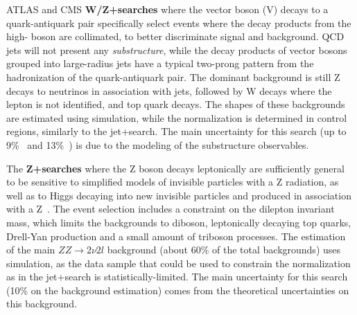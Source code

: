 ATLAS and CMS \textbf{W/Z+\MET searches} where the vector boson (V) decays to a quark-antiquark pair specifically select events where the decay products from the high-\pt{} boson are collimated, to better discriminate signal and background. 
QCD jets will not present any \textit{substructure}, while the decay products of vector bosons grouped into large-radius jets have a typical two-prong pattern from the hadronization of the quark-antiquark pair. 
The dominant background is still Z decays to neutrinos in association with jets, followed by W decays where the lepton is not identified, and top quark decays. 
The shapes of these backgrounds are estimated using simulation, while the normalization is determined in control regions, similarly to the jet+\MET search. 
The main uncertainty for this search (up to 9\%~\cite{Sirunyan:2017jix} and 13\%~\cite{Aaboud:2016qgg}) %
is due to the modeling of the substructure observables. 

\begin{marginnote}[]
\end{marginnote}

The \textbf{Z+\MET searches} where the Z boson decays leptonically are sufficiently general to be sensitive to simplified models of invisible particles with a Z radiation, as well as to Higgs decaying into new invisible particles and produced in association with a Z~\cite{Sirunyan:2017qfc, Aaboud:2017bja}. 
The event selection includes a constraint on the dilepton invariant mass, which limits the backgrounds to diboson, leptonically decaying top quarks, Drell-Yan production and a small amount of triboson processes. 
The estimation of the main $ZZ\rightarrow 2\nu 2l$ background (about 60\% of the total backgrounds) uses simulation, as the data sample that could be used to constrain the normalization as in the jet+\MET search is statistically-limited. The main uncertainty for this search (10\% on the background estimation) comes from the theoretical uncertainties on this background. 

